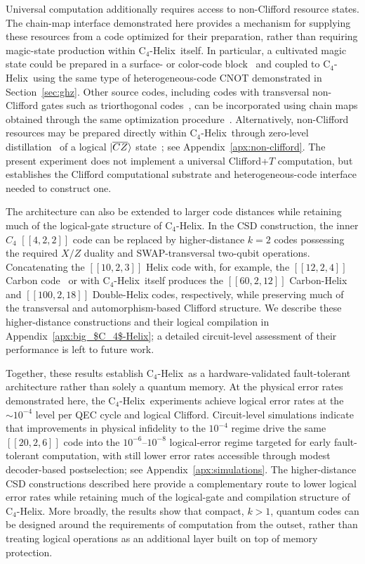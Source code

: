 \documentclass[aps,prx,reprint,showpacs,twocolumn,superscriptaddress,eqsecnum]{revtex4-2}
\newcommand{\chelix}{C$_4$-Helix}
\begin{document}
Universal computation additionally requires access to non-Clifford resource states. The chain-map interface demonstrated here provides a mechanism for supplying these resources from a code optimized for their preparation, rather than requiring magic-state production within \chelix\ itself. In particular, a cultivated magic state could be prepared in a surface- or color-code block~\cite{gidney2024} and coupled to \chelix\ using the same type of heterogeneous-code CNOT demonstrated in Section~\ref{sec:ghz}. Other source codes, including codes with transversal non-Clifford gates such as triorthogonal codes~\cite{Bravyi_2012}, can be incorporated using chain maps obtained through the same optimization procedure~\cite{benhemou2026}. Alternatively, non-Clifford resources may be prepared directly within \chelix\ through zero-level distillation~\cite{Itogawa_2025} of a logical $\ket{\overline{CZ}}$ state~\cite{Gupta2024}; see Appendix~\ref{apx:non-clifford}. The present experiment does not implement a universal Clifford+$T$ computation, but establishes the Clifford computational substrate and heterogeneous-code interface needed to construct one.

The architecture can also be extended to larger code distances while retaining much of the logical-gate structure of \chelix. In the CSD construction, the inner $C_4$ $[[4,2,2]]$ code can be replaced by higher-distance $k=2$ codes possessing the required $X/Z$ duality and SWAP-transversal two-qubit operations. Concatenating the $[[10,2,3]]$ Helix code with, for example, the $[[12,2,4]]$ Carbon code~\cite{paetznick2024} or with \chelix\ itself produces the $[[60,2,12]]$ Carbon-Helix and $[[100,2,18]]$ Double-Helix codes, respectively, while preserving much of the transversal and automorphism-based Clifford structure. We describe these higher-distance constructions and their logical compilation in Appendix~\ref{apx:big_$C_4$-Helix}; a detailed circuit-level assessment of their performance is left to future work.

Together, these results establish \chelix\ as a hardware-validated fault-tolerant architecture rather than solely a quantum memory. At the physical error rates demonstrated here, the \chelix\ experiments achieve logical error rates at the $\sim10^{-4}$ level per QEC cycle and logical Clifford. Circuit-level simulations indicate that improvements in physical infidelity to the $10^{-4}$ regime drive the same $[[20,2,6]]$ code into the $10^{-6}$--$10^{-8}$ logical-error regime targeted for early fault-tolerant computation, with still lower error rates accessible through modest decoder-based postselection; see Appendix~\ref{apx:simulations}. The higher-distance CSD constructions described here provide a complementary route to lower logical error rates while retaining much of the logical-gate and compilation structure of \chelix. More broadly, the results show that compact, $k>1$, quantum codes can be designed around the requirements of computation from the outset, rather than treating logical operations as an additional layer built on top of memory protection.
\end{document}
